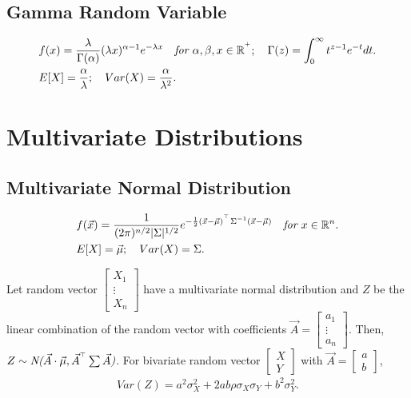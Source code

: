 \documentclass{article}
\begin{document}
\subsection{Gamma Random Variable}
\begin{align*}
    & f(x) = \frac{\lambda}{\Gamma(\alpha)} (\lambda x)^{\alpha-1} e^{-\lambda x} \quad \emph{for $\alpha, \beta, x\in \mathbb{R}^{^+}$}; \quad \Gamma(z) = \int_0^\infty t^{z-1}e^{-t}dt. \\
    & E[X] = \frac{\alpha}{\lambda}; \quad Var(X) = \frac{\alpha}{\lambda^2}.
\end{align*}

\newpage
\section{Multivariate Distributions}
\subsection{Multivariate Normal Distribution}
\begin{align*}
    & f(\vec{x}) = \frac{1}{(2\pi)^{n/2}|\Sigma|^{1/2}} e^{-\frac{1}{2}(\vec{x}-\vec{\mu})^{^\top}\Sigma^{-1}(\vec{x}-\vec{\mu})} \quad \emph{for $x\in \mathbb{R}^n$}. \\
    & E[X] = \vec{\mu}; \quad Var(X) = \Sigma.
\end{align*}

Let random vector $\begin{bmatrix} X_1 \\ \vdots \\ X_n \end{bmatrix}$ have a multivariate normal distribution and $Z$ be the linear combination of the random vector with coefficients $\vec{A} = \begin{bmatrix}
    a_1 \\ 
    \vdots \\
    a_n
\end{bmatrix}$.
Then, $Z\sim \emph{N($\vec{A}\cdot \vec{\mu},\vec{A}^{^\top}\sum\vec{A}$)}$.
For bivariate random vector $\begin{bmatrix}
    X \\ Y
\end{bmatrix}$ with $\vec{A} = \begin{bmatrix}
    a \\ b
\end{bmatrix}$,
\begin{align*}
    Var(Z) = a^2\sigma_X^2+2ab\rho\sigma_X\sigma_Y+b^2\sigma_Y^2.
\end{align*}
\end{document}
